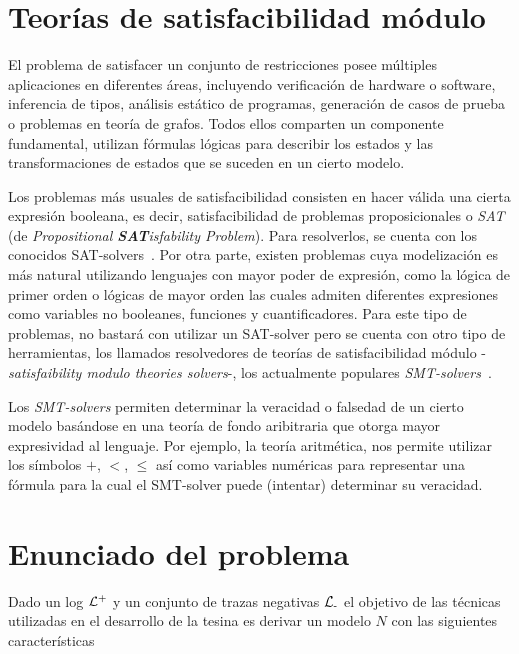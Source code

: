 \section{Teorías de satisfacibilidad módulo}
\label{sec:2.smt}

El problema de satisfacer un conjunto de restricciones posee múltiples aplicaciones
en diferentes áreas, incluyendo verificación de hardware o software, inferencia de 
tipos, análisis estático de programas, generación de casos de prueba o problemas en
teoría de grafos. Todos ellos comparten un componente fundamental, utilizan fórmulas
lógicas para describir los estados y las transformaciones de estados que se suceden
en un cierto modelo.

Los problemas más usuales de satisfacibilidad consisten en hacer válida una cierta 
expresión booleana, es decir, satisfacibilidad de problemas proposicionales 
o \textit{SAT} (de \textit{Propositional \textbf{SAT}isfability Problem}). Para resolverlos,
se cuenta con los conocidos SAT-solvers~\cite{barrettSMT2009}.
Por otra parte, existen problemas cuya modelización es más natural utilizando lenguajes con
mayor poder de expresión, como la lógica de primer orden o lógicas de mayor orden las cuales
admiten diferentes expresiones como variables no booleanes, funciones y cuantificadores.
Para este tipo de problemas, no bastará con utilizar un SAT-solver pero se cuenta con
otro tipo de herramientas, los llamados resolvedores de teorías de satisfacibilidad módulo
-\textit{satisfaibility modulo theories solvers}-, los actualmente populares \textit{SMT-solvers}~\cite{deMoura2009}.

Los \textit{SMT-solvers} permiten determinar la veracidad o falsedad de un cierto modelo
basándose en una teoría de fondo aribitraria que otorga mayor expresividad al lenguaje.
Por ejemplo, la teoría aritmética, nos permite utilizar los símbolos  $+$, $<$, $\leq$ 
así como variables numéricas para representar una fórmula para la cual 
el SMT-solver puede (intentar) determinar su veracidad.

\section{Enunciado del problema} 
\label{sec:2.problem}

Dado un log ${\mathcal L}\textsuperscript{+}$ y un conjunto de trazas negativas ${\mathcal L}\textsubscript{-}$ el objetivo de las técnicas utilizadas
en el desarrollo de la tesina es derivar un modelo $N$ con las siguientes características\\

